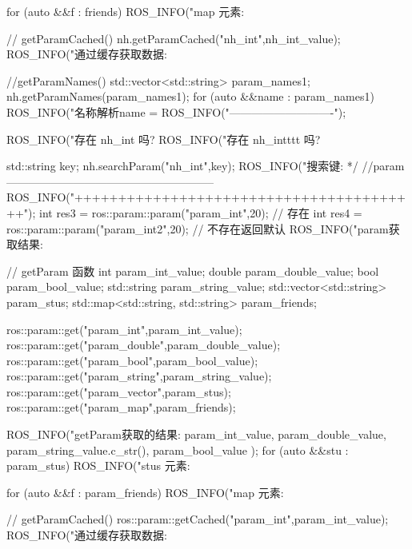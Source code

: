 \documentclass[openany, fontset=windowsold]{ctexbook}
\theoremstyle{kaiti}
\theoremstyle{normal}
\begin{document}
\begin{cpp}
{      for (auto &&f : friends)
      {
          ROS_INFO("map 元素:%
      }

      // getParamCached()
      nh.getParamCached("nh_int",nh_int_value);
      ROS_INFO("通过缓存获取数据:%

      //getParamNames()
      std::vector<std::string> param_names1;
      nh.getParamNames(param_names1);
      for (auto &&name : param_names1)
      {
          ROS_INFO("名称解析name = %
      }
      ROS_INFO("----------------------------");

      ROS_INFO("存在 nh_int 吗? %
      ROS_INFO("存在 nh_intttt 吗? %

      std::string key;
      nh.searchParam("nh_int",key);
      ROS_INFO("搜索键:%
      */
      //param--------------------------------------------------------
      ROS_INFO("++++++++++++++++++++++++++++++++++++++++");
      int res3 = ros::param::param("param_int",20); // 存在
      int res4 = ros::param::param("param_int2",20); //  不存在返回默认
      ROS_INFO("param获取结果:%

      // getParam 函数
      int param_int_value;
      double param_double_value;
      bool param_bool_value;
      std::string param_string_value;
      std::vector<std::string> param_stus;
      std::map<std::string, std::string> param_friends;

      ros::param::get("param_int",param_int_value);
      ros::param::get("param_double",param_double_value);
      ros::param::get("param_bool",param_bool_value);
      ros::param::get("param_string",param_string_value);
      ros::param::get("param_vector",param_stus);
      ros::param::get("param_map",param_friends);

      ROS_INFO("getParam获取的结果:%
              param_int_value,
              param_double_value,
              param_string_value.c_str(),
              param_bool_value
              );
      for (auto &&stu : param_stus)
      {
          ROS_INFO("stus 元素:%
      }

      for (auto &&f : param_friends)
      {
          ROS_INFO("map 元素:%
      }

      // getParamCached()
      ros::param::getCached("param_int",param_int_value);
      ROS_INFO("通过缓存获取数据:%

}
\end{cpp}
\end{document}
